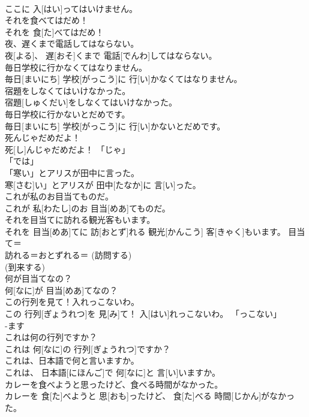 \documentclass[8pt]{extreport}
\begin{document}
\begin{CJK}{UTF8}{min}
\\	ここに 入[はい]ってはいけません。	
\\	それを食べてはだめ！	
\\	それを 食[た]べてはだめ！	
\\	夜、遅くまで電話してはならない。	
\\	夜[よる]、 遅[おそ]くまで 電話[でんわ]してはならない。	
\\	毎日学校に行かなくてはなりません。	
\\	毎日[まいにち] 学校[がっこう]に 行[い]かなくてはなりません。	
\\	宿題をしなくてはいけなかった。	
\\	宿題[しゅくだい]をしなくてはいけなかった。	
\\	毎日学校に行かないとだめです。	
\\	毎日[まいにち] 学校[がっこう]に 行[い]かないとだめです。	
\\	死んじゃだめだよ！	
\\	死[し]んじゃだめだよ！	「じゃ」
\\	「では」
\\	「寒い」とアリスが田中に言った。	
\\	寒[さむ]い」とアリスが 田中[たなか]に 言[い]った。	
\\	これが私のお目当てものだ。	
\\	これが 私[わたし]のお 目当[めあ]てものだ。	
\\	それを目当てに訪れる観光客もいます。	
\\	それを 目当[めあ]てに 訪[おとず]れる 観光[かんこう] 客[きゃく]もいます。	目当て＝ 
\\	訪れる＝おとずれる＝ (訪問する) 
\\	(到来する) 
\\	何が目当てなの？	
\\	何[なに]が 目当[めあ]てなの？	
\\	この行列を見て！入れっこないわ。	
\\	この 行列[ぎょうれつ]を 見[み]て！ 入[はい]れっこないわ。	「っこない」
\\	-ます 
\\	これは何の行列ですか？	
\\	これは 何[なに]の 行列[ぎょうれつ]ですか？	
\\	これは、日本語で何と言いますか。	
\\	これは、 日本語[にほんご]で 何[なに]と 言[い]いますか。	
\\	カレーを食べようと思ったけど、食べる時間がなかった。	
\\	カレーを 食[た]べようと 思[おも]ったけど、 食[た]べる 時間[じかん]がなかった。	

\end{CJK}
\end{document}
